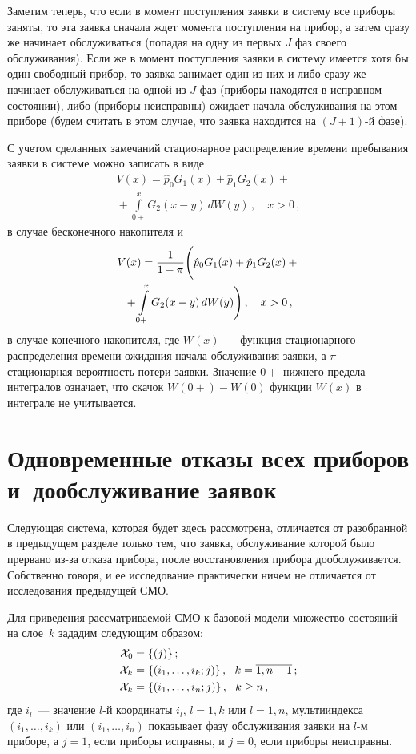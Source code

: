 \begin{multicols}{2}
{}

Заметим теперь, что если в момент поступления заявки в систему
все приборы заняты, то эта заявка сначала ждет момента
поступления на прибор, а затем сразу же начинает обслуживаться
(попадая на одну из первых $J$ фаз своего обслуживания).
Если же в момент поступления заявки в систему имеется хотя бы
один свободный прибор, то заявка занимает один из них и
либо сразу же начинает обслуживаться на одной из $J$ фаз
(приборы находятся в исправном состоянии),
либо (приборы неисправны) ожидает начала обслуживания на этом
приборе (будем считать в этом случае, что заявка находится на
$(J+1)$-й фазе).


С учетом сделанных замечаний стационарное распределение времени
пребывания заявки в сис\-те\-ме можно записать в виде
\begin{multline}
V(x) =
\hat{p}_0 G_1 (x)
+
\hat{p}_1 G_2 (x) +{}\\
{}+ \int\limits_{0+}^{x}
G_2(x-y)\,dW(y)\,,
\quad x>0\,,
\label{V_x_1}
\end{multline}
в случае бесконечного накопителя и
\begin{multline}
\label{Vx2}
V(x) = \displaystyle\frac{\displaystyle 1\mathstrut}{\displaystyle 1-\pi\mathstrut} \Bigg( \hat{p}_0 G_1 (x) +
\hat{p}_1 G_2 (x) +{}\\
{}+ \int\limits_{0+}^{x} G_2(x-y)\, dW(y) \Bigg)\,,
\quad x>0\,,
\end{multline}
в случае конечного накопителя,
где $W(x)$~--- функция стационарного распределения времени ожидания
начала обслуживания заявки, а $\pi$~--- стационарная вероятность
потери заявки.
Значение $0{+}$ нижнего предела интегралов означает, что скачок
$W(0{+})-W(0)$ функции $W(x)$ в интеграле не учитывается.

\section{Одновременные отказы всех приборов
и~дообслуживание заявок}    %

Следующая система, которая будет здесь рассмотрена, отличается от
разобранной в предыдущем разделе только тем, что
заявка, обслуживание которой было прервано из-за отказа прибора,
после восстановления прибора дообслуживается.
Собственно говоря, и ее исследование практически ничем не
отличается от исследования предыдущей СМО.

Для приведения рассматриваемой СМО к базовой модели множество
состояний на слое~$k$ зададим следующим образом:
\begin{align*}
{\cal X}_0 &= \{(j)\}\,;\\
{\cal X}_k  &= \{(i_1,\ldots,i_k;j)\}\,,\
\ k=\overline{1,n-1}\,;\\
{\cal X}_k &= \{(i_1,\ldots,i_n;j)\}\,,
\ \ k \ge n\,,
\end{align*}
где $i_l$~--- значение $l$-й координаты
$i_l$, $l=\overline{1,k}$ или $l=\overline{1,n}$,
мультииндекса $(i_1,\ldots,i_k)$ или $(i_1,\ldots,i_n)$ показывает
фазу обслуживания заявки на $l$-м приборе,
а $j=1$, если приборы исправны, и $j=0$, если приборы неисправны.


\end{multicols}
